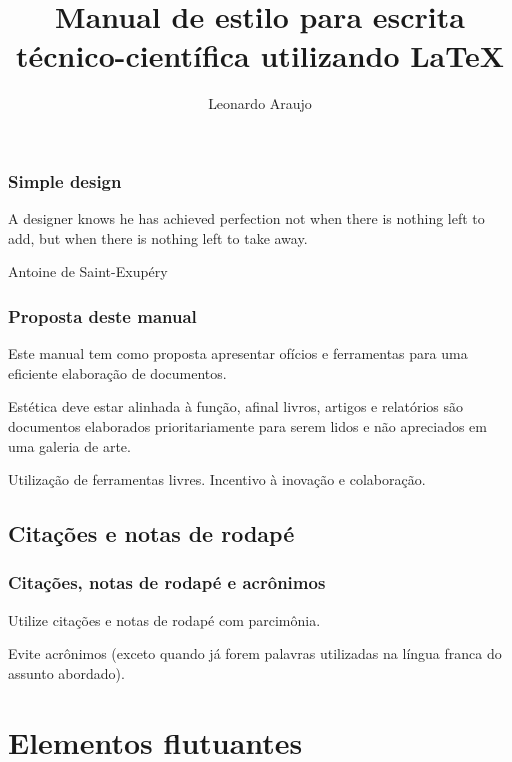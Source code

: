 \documentclass[10pt,notes,compress,aspectratio=169]{beamer}
\title[Manual de estilo]{Manual de estilo para escrita técnico-científica utilizando \LaTeX{}}
\author{Leonardo Araujo}
\institute{UFSJ}
\date{}
\begin{document}
\frame{\titlepage}

\begin{frame}
\frametitle{Simple design}
\epigraph{A designer knows he has achieved perfection not when there is nothing left to add, but when there is nothing left to take away.}{Antoine de Saint-Exupéry}
\end{frame}


\begin{frame}
\frametitle{Proposta deste manual}
Este manual tem como proposta apresentar ofícios e ferramentas para uma eficiente elaboração
de documentos.
\pause

\vspace{3ex}
Estética deve estar alinhada à função, afinal livros, artigos e relatórios são documentos
elaborados prioritariamente para serem lidos e não apreciados em uma galeria de arte.
\pause

\vspace{3ex}
Utilização de ferramentas livres. Incentivo à inovação e colaboração.
\end{frame}











\subsection{Citações e notas de rodapé}
\begin{frame}
\frametitle{Citações, notas de rodapé e acrônimos}
Utilize citações e notas de rodapé com parcimônia.

\vspace{3ex}
Evite acrônimos (exceto quando já forem palavras utilizadas na língua franca do assunto abordado).
\end{frame}















\section{Elementos flutuantes}
\end{document}
